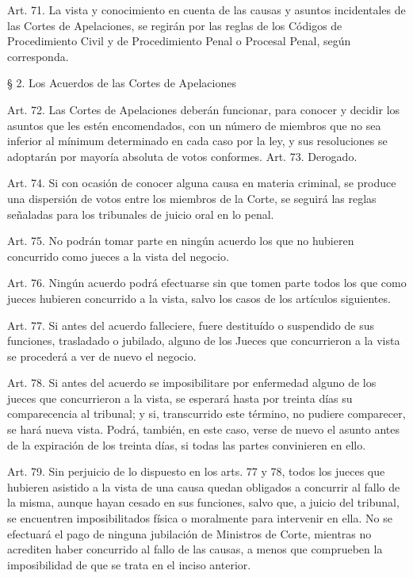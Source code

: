     Art. 71. La vista y conocimiento en cuenta de las causas y asuntos incidentales de las Cortes de Apelaciones, se regirán por las reglas de los Códigos de Procedimiento Civil y de Procedimiento Penal o Procesal Penal, según corresponda.




    § 2. Los Acuerdos de las Cortes de Apelaciones


    Art. 72. Las Cortes de Apelaciones deberán funcionar, para conocer y decidir los asuntos que les estén encomendados, con un número de miembros que no sea inferior al mínimum determinado en cada caso por la ley, y sus resoluciones se adoptarán por mayoría absoluta de votos conformes.
    Art. 73. Derogado.



    Art. 74. Si con ocasión de conocer alguna causa en materia criminal, se produce una dispersión de votos entre los miembros de la Corte, se seguirá las reglas señaladas para los tribunales de juicio oral en lo penal.


    Art. 75. No podrán tomar parte en ningún acuerdo los que no hubieren concurrido como jueces a la vista del negocio.


    Art. 76. Ningún acuerdo podrá efectuarse sin que tomen parte todos los que como jueces hubieren concurrido a la vista, salvo los casos de los artículos siguientes.


    Art. 77. Si antes del acuerdo falleciere, fuere destituído o suspendido de sus funciones, trasladado o jubilado, alguno de los Jueces que concurrieron a la vista se procederá a ver de nuevo el negocio.


    Art. 78. Si antes del acuerdo se imposibilitare por enfermedad alguno de los jueces que concurrieron a la vista, se esperará hasta por treinta días su comparecencia al tribunal; y si, transcurrido este término, no pudiere comparecer, se hará nueva vista.
    Podrá, también, en este caso, verse de nuevo el asunto antes de la expiración de los treinta días, si todas las partes convinieren en ello.

    Art. 79. Sin perjuicio de lo dispuesto en los arts. 77 y 78, todos los jueces que hubieren asistido a la vista de una causa quedan obligados a concurrir al fallo de la misma, aunque hayan cesado en sus funciones, salvo que, a juicio del tribunal, se encuentren imposibilitados física o moralmente para intervenir en ella.
    No se efectuará el pago de ninguna jubilación de Ministros de Corte, mientras no acrediten haber concurrido al fallo de las causas, a menos que comprueben la imposibilidad de que se trata en el inciso anterior.

